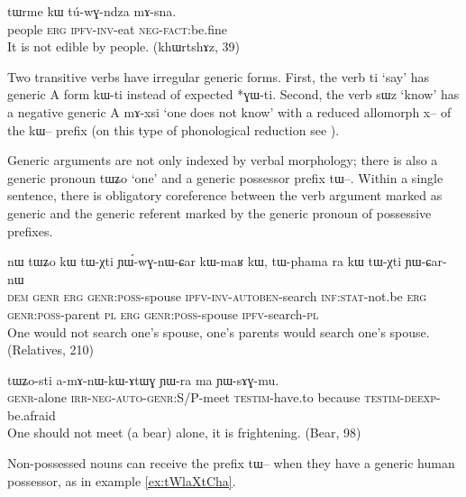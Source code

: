 \documentclass[oldfontcommands,oneside,a4paper,11pt]{article}
\newcommand{\ipa}[1]{{\phon \mbox{#1}}} %
\begin{document}
\begin{exe}
\ex \label{ex:tuwGndza.sna}
\gll
\ipa{tɯrme}  	\ipa{kɯ}  	\ipa{tú-wɣ-ndza}  	\ipa{mɤ-sna.}   \\
people \textsc{erg} \textsc{ipfv-inv}-eat \textsc{neg-fact}:be.fine \\
\glt It is not edible by people. (khɯrtshɤz, 39)
\end{exe}



Two transitive verbs have irregular generic forms. First, the verb \ipa{ti} `say' has generic A form \ipa{kɯ-ti} instead of expected *\ipa{ɣɯ-ti}. Second, the verb \ipa{sɯz} `know' has a negative generic A \ipa{mɤ-xsi} `one does not know' with a reduced allomorph \ipa{x--} of the \ipa{kɯ--} prefix (on this type of phonological reduction see \citealt{jacques14antipassive}).

Generic arguments are not only indexed by verbal morphology; there is also a generic pronoun \ipa{tɯʑo} `one' and a generic possessor prefix \ipa{tɯ--}. Within a single sentence, there is obligatory coreference between the verb argument marked as generic and the generic referent marked by the generic pronoun of possessive prefixes.

\begin{exe}
\ex \label{ex:YWwGnWCar}
\gll
\ipa{nɯ} 	\ipa{tɯʑo} 	\ipa{kɯ} 	\ipa{tɯ-χti} 	\ipa{ɲɯ́-wɣ-nɯ-ɕar} 	\ipa{kɯ-maʁ} 	\ipa{kɯ,} 	\ipa{tɯ-phama} 	\ipa{ra} 	\ipa{kɯ} 	\ipa{tɯ-χti} 	\ipa{ɲɯ-ɕar-nɯ} 	\\
\textsc{dem} \textsc{genr} \textsc{erg} \textsc{genr:poss}-spouse \textsc{ipfv-inv-autoben}-search \textsc{inf:stat}-not.be \textsc{erg} \textsc{genr:poss}-parent \textsc{pl} \textsc{erg} \textsc{genr:poss}-spouse \textsc{ipfv}-search-\textsc{pl} \\
\glt One would not search one's spouse, one's parents would search one's spouse. (Relatives, 210)
\end{exe}


\begin{exe}
\ex \label{ex:YWwGnWCar}
\gll
\ipa{tɯʑo-sti}  	\ipa{a-mɤ-nɯ-kɯ-ɤtɯɣ}  	\ipa{ɲɯ-ra}  	\ipa{ma}  	\ipa{ɲɯ-sɤɣ-mu.}  \\
\textsc{genr}-alone \textsc{irr-neg-auto-genr:S/P}-meet \textsc{testim}-have.to because \textsc{testim-deexp}-be.afraid \\
\glt One should not meet (a bear) alone, it is frightening. (Bear, 98)
\end{exe}


Non-possessed nouns can receive the prefix \ipa{tɯ--} when they have a generic human possessor, as in example \ref{ex:tWlaXtCha}. 
\end{document}
